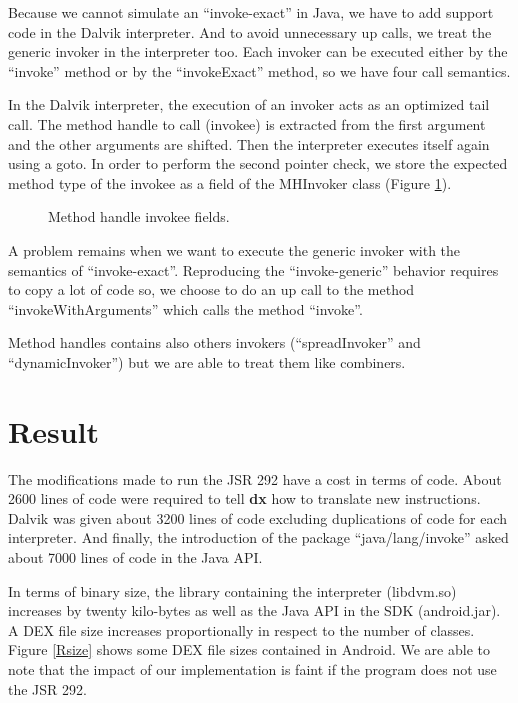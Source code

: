 \documentclass{sig-alternate}
\def \Jsr{JSR\xspace}
\def \JSR{\Jsr 292\xspace}
\newcommand{\fixme}[1]{{\color{red}FIXME #1}}
\begin{document}
      Because we cannot simulate an ``invoke-exact'' in Java, we have to add support code in the Dalvik interpreter.
      And to avoid unnecessary up calls, we treat the generic invoker in the interpreter too.
      Each invoker can be executed either by the ``invoke'' method or by the ``invokeExact'' method, so we have four call semantics.

      In the Dalvik interpreter, the execution of an invoker acts as an optimized tail call.
      The method handle to call (invokee) is extracted from the first argument and the other arguments are shifted.
      Then the interpreter executes itself again using a goto.
      In order to perform the second pointer check, we store the expected method type of the invokee as a field of the MHInvoker class (Figure \ref{invokeeFields}).

      \begin{figure}[!h]
        \centering \vspace{-1.5em}
        \caption{Method handle invokee fields.}
        \label{invokeeFields}
      \end{figure}

      A problem remains when we want to execute the generic invoker with the semantics of ``invoke-exact''.
      Reproducing the ``invoke-generic'' behavior requires to copy a lot of code so,
      we choose to do an up call to the method ``invokeWithArguments'' which calls the method ``invoke''.

      Method handles contains also others invokers (``spreadInvoker'' and ``dynamicInvoker'') but we are able to treat them like combiners.

\section{Result}
 \label{result}

  The modifications made to run the \JSR have a cost in terms of code.
  About 2600 lines of code were required to tell {\bf dx} how to translate new instructions.
  Dalvik was given about 3200 lines of code excluding duplications of code for each interpreter.
  And finally, the introduction of the package ``java/lang/invoke'' asked about 7000 lines of code in the Java API.


  In terms of binary size, the library containing the interpreter (libdvm.so) increases by twenty kilo-bytes as well as the Java API in the SDK (android.jar).
  A DEX file size increases proportionally in respect to the number of classes.
  Figure \ref{Rsize} shows some DEX file sizes contained in Android.
  We are able to note that the impact of our implementation is faint if the program does not use the \JSR.
\end{document}
